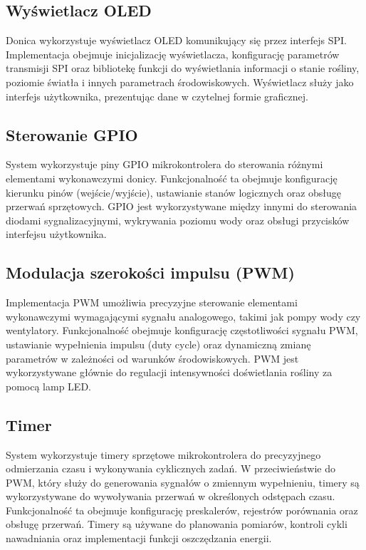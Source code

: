 \documentclass{article}
\begin{document}
\subsection{Wyświetlacz OLED}
Donica wykorzystuje wyświetlacz OLED komunikujący się przez interfejs SPI. Implementacja obejmuje inicjalizację wyświetlacza, konfigurację parametrów transmisji SPI oraz bibliotekę funkcji do wyświetlania informacji o stanie rośliny, poziomie światła i innych parametrach środowiskowych. Wyświetlacz służy jako interfejs użytkownika, prezentując dane w czytelnej formie graficznej.

\subsection{Sterowanie GPIO}
System wykorzystuje piny GPIO mikrokontrolera do sterowania różnymi elementami wykonawczymi donicy. Funkcjonalność ta obejmuje konfigurację kierunku pinów (wejście/wyjście), ustawianie stanów logicznych oraz obsługę przerwań sprzętowych. GPIO jest wykorzystywane między innymi do sterowania diodami sygnalizacyjnymi, wykrywania poziomu wody oraz obsługi przycisków interfejsu użytkownika.

\subsection{Modulacja szerokości impulsu (PWM)}
Implementacja PWM umożliwia precyzyjne sterowanie elementami wykonawczymi wymagającymi sygnału analogowego, takimi jak pompy wody czy wentylatory. Funkcjonalność obejmuje konfigurację częstotliwości sygnału PWM, ustawianie wypełnienia impulsu (duty cycle) oraz dynamiczną zmianę parametrów w zależności od warunków środowiskowych. PWM jest wykorzystywane głównie do regulacji intensywności doświetlania rośliny za pomocą lamp LED.

\subsection{Timer}
System wykorzystuje timery sprzętowe mikrokontrolera do precyzyjnego odmierzania czasu i wykonywania cyklicznych zadań. W przeciwieństwie do PWM, który służy do generowania sygnałów o zmiennym wypełnieniu, timery są wykorzystywane do wywoływania przerwań w określonych odstępach czasu. Funkcjonalność ta obejmuje konfigurację preskalerów, rejestrów porównania oraz obsługę przerwań. Timery są używane do planowania pomiarów, kontroli cykli nawadniania oraz implementacji funkcji oszczędzania energii.
\end{document}
